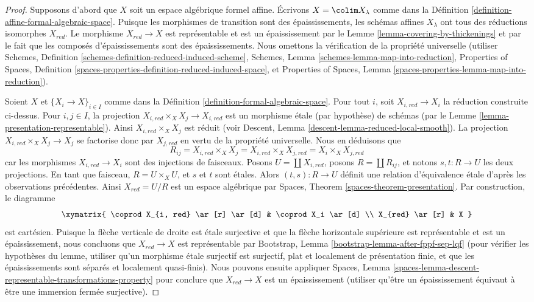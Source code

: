 \begin{proof}
Supposons d'abord que $X$ soit un espace algébrique formel affine.
Écrivons $X = \colim X_\lambda$ comme dans la
Définition \ref{definition-affine-formal-algebraic-space}.
Puisque les morphismes de transition sont des épaississements, les schémas
affines $X_\lambda$ ont tous des réductions isomorphes $X_{red}$.
Le morphisme $X_{red} \to X$ est représentable et est un épaississement
par le Lemme \ref{lemma-covering-by-thickenings} et par le fait que
les composés d'épaississements sont des épaississements. Nous omettons la
vérification de la propriété
universelle (utiliser Schemes, Definition
\ref{schemes-definition-reduced-induced-scheme},
Schemes, Lemma \ref{schemes-lemma-map-into-reduction},
Properties of Spaces, Definition
\ref{spaces-properties-definition-reduced-induced-space}, et
Properties of Spaces, Lemma \ref{spaces-properties-lemma-map-into-reduction}).

\medskip\noindent
Soient $X$ et $\{X_i \to X\}_{i \in I}$ comme dans la
Définition \ref{definition-formal-algebraic-space}.
Pour tout $i$, soit $X_{i, red} \to X_i$ la réduction construite
ci-dessus. Pour $i, j \in I$, la projection
$X_{i, red} \times_X X_j \to X_{i, red}$ est un morphisme étale (par hypothèse)
de schémas (par le Lemme \ref{lemma-presentation-representable}).
Ainsi $X_{i, red} \times_X X_j$ est réduit (voir
Descent, Lemma \ref{descent-lemma-reduced-local-smooth}).
La projection $X_{i, red} \times_X X_j \to X_j$ se factorise donc
par $X_{j, red}$ en vertu de la propriété universelle. Nous en déduisons que
$$
R_{ij} = X_{i, red} \times_X X_j = X_{i, red} \times_X X_{j, red} =
X_i \times_X X_{j, red}
$$
car les morphismes $X_{i, red} \to X_i$ sont des injections de faisceaux.
Posons $U = \coprod X_{i, red}$, posons
$R = \coprod R_{ij}$, et notons $s, t : R \to U$ les deux
projections. En tant que faisceau, $R = U \times_X U$, et $s$ et $t$
sont étales. Alors $(t, s) : R \to U$ définit une relation d'équivalence
étale d'après les observations précédentes. Ainsi $X_{red} = U/R$ est un
espace algébrique par Spaces, Theorem \ref{spaces-theorem-presentation}.
Par construction, le diagramme
$$
\xymatrix{
\coprod X_{i, red} \ar[r] \ar[d] & \coprod X_i \ar[d] \\
X_{red} \ar[r] & X
}
$$
est cartésien. Puisque la flèche verticale de droite est étale surjective
et que la flèche horizontale supérieure est représentable et est un épaississement,
nous concluons que $X_{red} \to X$ est représentable par
Bootstrap, Lemma \ref{bootstrap-lemma-after-fppf-sep-lqf}
(pour vérifier les hypothèses du lemme, utiliser qu'un morphisme étale
surjectif est surjectif, plat et localement de présentation
finie, et que les épaississements sont séparés et localement quasi-finis).
Nous pouvons ensuite appliquer Spaces, Lemma
\ref{spaces-lemma-descent-representable-transformations-property}
pour conclure que $X_{red} \to X$ est un épaississement
(utiliser qu'être un épaississement équivaut à être
une immersion fermée surjective).


\end{proof}
